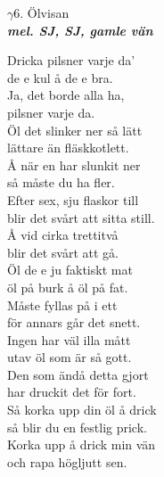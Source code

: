 \documentclass[a6paper,10pt]{article}
\newcommand{\mel}[1]{\small\textbf{\textit{mel. #1 \\}}}
\begin{document}
\setlength{\oddsidemargin}{-0.47in}
\begin{center}
\Large $\gamma6$. Ölvisan \\ 
\mel{SJ, SJ, gamle vän}
\end{center}
Dricka pilsner varje da'\\
de e kul å de e bra.\\
Ja, det borde alla ha,\\
pilsner varje da.
\vspace{5pt}\\
Öl det slinker ner så lätt\\
lättare än fläskkotlett.\\
Å när en har slunkit ner\\
så måste du ha fler.
\vspace{5pt}\\
Efter sex, sju flaskor till\\
blir det svårt att sitta still.\\
Å vid cirka trettitvå\\
blir det svårt att gå.
\vspace{5pt}\\
Öl de e ju faktiskt mat\\
öl på burk å öl på fat.\\
Måste fyllas på i ett\\
för annars går det snett.
\vspace{5pt}\\
Ingen har väl illa mått\\
utav öl som är så gott.\\
Den som ändå detta gjort\\
har druckit det för fort.
\vspace{5pt}\\
Så korka upp din öl å drick\\
så blir du en festlig prick.\\
Korka upp å drick min vän\\
och rapa högljutt sen.
\end{document}

